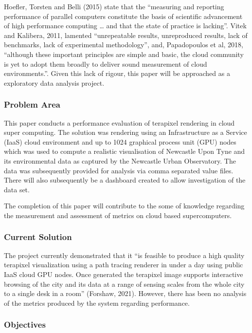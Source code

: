 \documentclass[
  twocolumn]{article}
\begin{document}
Hoefler, Torsten and Belli (2015) state that the ``measuring and
reporting performance of parallel computers constitute the basis of
scientific advancement of high performance computing \ldots{} and that
the state of practice is lacking''. Vitek and Kalibera, 2011, lamented
``unrepeatable results, unreproduced results, lack of benchmarks, lack
of experimental methodology'', and, Papadopoulos et al, 2018, ``although
these important principles are simple and basic, the cloud community is
yet to adopt them broadly to deliver sound measurement of cloud
environments.''. Given this lack of rigour, this paper will be
approached as a exploratory data analysis project.

\hypertarget{problem-area}{%
\subsubsection{Problem Area}\label{problem-area}}

This paper conducts a performance evaluation of terapixel rendering in
cloud super computing. The solution was rendering using an
Infrastructure as a Service (IaaS) cloud environment and up to 1024
graphical process unit (GPU) nodes which was used to compute a realistic
visualisation of Newcastle Upon Tyne and its environmental data as
captured by the Newcastle Urban Observatory. The data was subsequently
provided for analysis via comma separated value files. There will also
subsequently be a dashboard created to allow investigation of the data
set.

The completion of this paper will contribute to the some of knowledge
regarding the measurement and assessment of metrics on cloud based
supercomputers.

\hypertarget{current-solution}{%
\subsubsection{Current Solution}\label{current-solution}}

The project currently demonstrated that it ``is feasible to produce a
high quality terapixel visualization using a path tracing renderer in
under a day using public IaaS cloud GPU nodes. Once generated the
terapixel image supports interactive browsing of the city and its data
at a range of sensing scales from the whole city to a single desk in a
room'' (Forshaw, 2021). However, there has been no analysis of the
metrics produced by the system regarding performance.

\hypertarget{objectives}{%
\subsubsection{Objectives}\label{objectives}}
\end{document}
